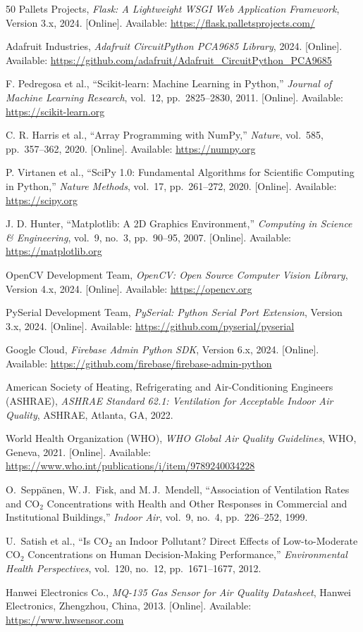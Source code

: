\begin{thebibliography}{50}
Pallets Projects,
\textit{Flask: A Lightweight WSGI Web Application Framework},
Version 3.x, 2024.
[Online]. Available: \url{https://flask.palletsprojects.com/}

Adafruit Industries,
\textit{Adafruit CircuitPython PCA9685 Library},
2024.
[Online]. Available: \url{https://github.com/adafruit/Adafruit_CircuitPython_PCA9685}

F. Pedregosa et al.,
``Scikit-learn: Machine Learning in Python,''
\textit{Journal of Machine Learning Research},
vol.~12, pp.~2825--2830, 2011.
[Online]. Available: \url{https://scikit-learn.org}

C. R. Harris et al.,
``Array Programming with NumPy,''
\textit{Nature},
vol.~585, pp.~357--362, 2020.
[Online]. Available: \url{https://numpy.org}

P. Virtanen et al.,
``SciPy 1.0: Fundamental Algorithms for Scientific Computing in Python,''
\textit{Nature Methods},
vol.~17, pp.~261--272, 2020.
[Online]. Available: \url{https://scipy.org}

J. D. Hunter,
``Matplotlib: A 2D Graphics Environment,''
\textit{Computing in Science \& Engineering},
vol.~9, no.~3, pp.~90--95, 2007.
[Online]. Available: \url{https://matplotlib.org}

OpenCV Development Team,
\textit{OpenCV: Open Source Computer Vision Library},
Version 4.x, 2024.
[Online]. Available: \url{https://opencv.org}

PySerial Development Team,
\textit{PySerial: Python Serial Port Extension},
Version 3.x, 2024.
[Online]. Available: \url{https://github.com/pyserial/pyserial}

Google Cloud,
\textit{Firebase Admin Python SDK},
Version 6.x, 2024.
[Online]. Available: \url{https://github.com/firebase/firebase-admin-python}

American Society of Heating, Refrigerating and Air-Conditioning Engineers (ASHRAE),
\textit{ASHRAE Standard 62.1: Ventilation for Acceptable Indoor Air Quality},
ASHRAE, Atlanta, GA, 2022.

World Health Organization (WHO),
\textit{WHO Global Air Quality Guidelines},
WHO, Geneva, 2021.
[Online]. Available: \url{https://www.who.int/publications/i/item/9789240034228}

O.\ Sepp\"{a}nen, W.\,J.\ Fisk, and M.\,J.\ Mendell,
``Association of Ventilation Rates and CO$_2$ Concentrations with Health
and Other Responses in Commercial and Institutional Buildings,''
\textit{Indoor Air},
vol.~9, no.~4, pp.~226--252, 1999.

U.\ Satish et al.,
``Is CO$_2$ an Indoor Pollutant? Direct Effects of Low-to-Moderate
CO$_2$ Concentrations on Human Decision-Making Performance,''
\textit{Environmental Health Perspectives},
vol.~120, no.~12, pp.~1671--1677, 2012.

Hanwei Electronics Co.,
\textit{MQ-135 Gas Sensor for Air Quality Datasheet},
Hanwei Electronics, Zhengzhou, China, 2013.
[Online]. Available: \url{https://www.hwsensor.com}

\end{thebibliography}